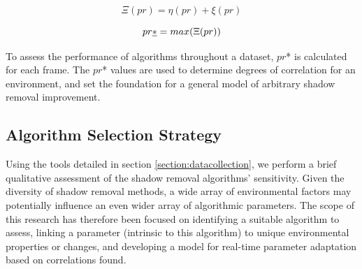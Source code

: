 \begin{equation}
\Xi(pr) = \eta(pr) + \xi(pr)
\label{eqn:score}
\end{equation}

\begin{equation}
pr\emph{*} = max(\Xi(pr))
\label{eqn:optscore}
\end{equation}

To assess the performance of algorithms throughout a dataset, $pr$* is calculated for each frame. The $pr$* values are used to determine degrees of correlation for an environment, and set the foundation for a general model of arbitrary shadow removal improvement.

\FloatBarrier
\subsection{Algorithm Selection Strategy} \label{section:selectalgorithm}

Using the tools detailed in section \ref{section:datacollection}, we perform a brief qualitative assessment of the shadow removal algorithms' sensitivity. Given the diversity of shadow removal methods, a wide array of environmental factors may potentially influence an even wider array of algorithmic parameters. The scope of this research has therefore been focused on identifying a suitable algorithm to assess, linking a parameter (intrinsic to this algorithm) to unique environmental properties or changes, and developing a model for real-time parameter adaptation based on correlations found.


